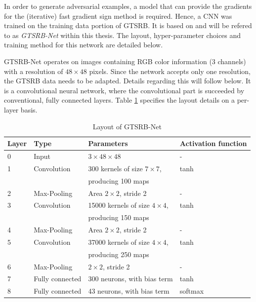 \documentclass[11pt, a4paper]{article}
\begin{document}

In order to generate adversarial examples, a model that can provide the gradients for the (iterative) fast gradient sign method is required. Hence, a CNN was trained on the training data portion of GTSRB. It is based on \cite{multi-column-neural-network-gtsrb} and will be refered to as \emph{GTSRB-Net} within this thesis. The layout, hyper-parameter choices and training method for this network are detailed below.

GTSRB-Net operates on images containing RGB color information (3 channels) with a resolution of $48 \times 48$ pixels. Since the network accepts only one resolution, the GTSRB data needs to be adapted. Details regarding this will follow below. It is a convolutional neural network, where the convolutional part is succeeded by conventional, fully connected layers. Table \ref{tab:gtsrb-layout} specifies the layout details on a per-layer basis.

\begin{table}[h!tb]
	\centering
	\begin{tabular}{|l|lll|}
		\hline
		Layer & Type & Parameters & Activation function \\
		\hline
		0 & Input & $3 \times 48 \times 48$ & - \\
		1 & Convolution & 300 kernels of size $7 \times 7$, & tanh \\
		& & producing 100 maps & \\
		2 & Max-Pooling & Area $2\times 2$, stride 2 & - \\
		3 & Convolution & 15000 kernels of size $4 \times 4$, & tanh \\
		& & producing 150 maps & \\
		4 & Max-Pooling & Area $2\times 2$, stride 2 & - \\
		5 & Convolution & 37000 kernels of size $4 \times 4$, & tanh \\
		& & producing 250 maps & \\
		6 & Max-Pooling & $2\times 2$, stride 2 & - \\
		7 & Fully connected & 300 neurons, with bias term & tanh \\
		8 & Fully connected & 43 neurons, with bias term & softmax \\
		\hline
	\end{tabular}
	\caption{Layout of GTSRB-Net}
	\label{tab:gtsrb-layout}
\end{table}
\end{document}
